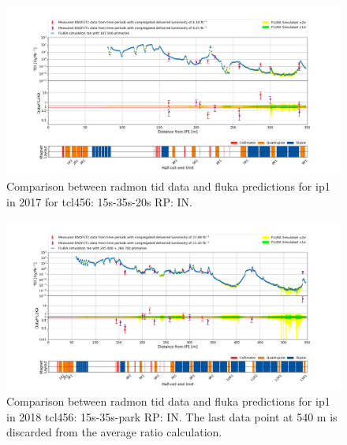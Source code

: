 \documentclass[encoding=utf8,british]{tumphthesis}
\begin{document}
\begin{figure}[H]
    \centering
    \includegraphics[width=0.9\linewidth]{results/benchmark_RadMON_TID_IP1_2017_0_350m.png}
    \caption{Comparison between \acrshort{radmon} \acrshort{tid} data and \acrshort{fluka} predictions for \acrshort{ip}1 in 2017 for \acrshort{tcl}456: 15s-35s-20s RP: IN.}
    \label{fig:benchmark-radmon-tid-2017}
\end{figure}


\begin{figure}[H]
    \centering
    \includegraphics[width=0.9\linewidth]{results/benchmark_RadMON_TID_IP1_2018_0_550m.png}
    \caption{Comparison between \acrshort{radmon} \acrshort{tid} data and \acrshort{fluka} predictions for \acrshort{ip}1 in 2018 \acrshort{tcl}456: 15s-35s-park RP: IN. The last data point at 540 m is discarded from the average ratio calculation.}
    \label{fig:benchmark-radmon-tid-ip1-2018}
\end{figure}
\end{document}
